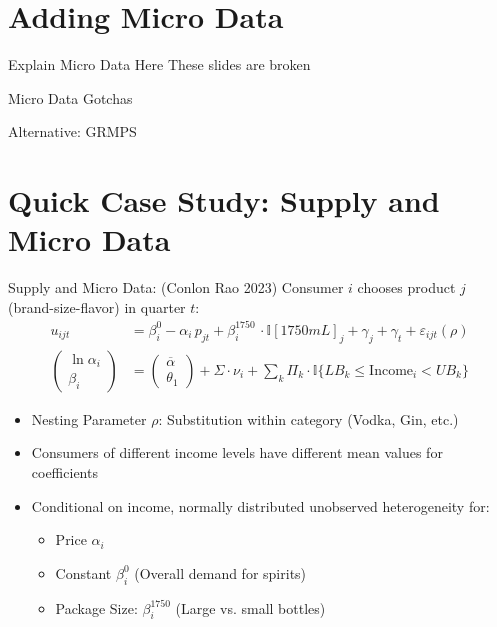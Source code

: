 \section*{Adding Micro Data}

\begin{frame}{Explain Micro Data Here}
These slides are broken
\end{frame}

\begin{frame}{Micro Data Gotchas}
\end{frame}

\begin{frame}{Alternative: GRMPS}
\end{frame}


\section*{Quick Case Study: Supply and Micro Data}

\begin{frame}{Supply and Micro Data: (Conlon Rao 2023)}
Consumer $i$ chooses product $j$ (brand-size-flavor) in quarter $t$:
\begin{align*}
u_{ijt} &= \beta_{i}^0 -  \alpha_i\, p_{jt} + \beta_i^{1750}\, \cdot \mathbb{I}[1750mL]_j + \gamma_j + \gamma_t+ \varepsilon_{ijt}(\rho)\\
\begin{pmatrix}
\ln \alpha_i\\
\beta_i
\end{pmatrix} &=
\begin{pmatrix}
\overline{\alpha}\\
\theta_1
\end{pmatrix} + \Sigma \cdot \nu_i + \sum_{k} \Pi_k \cdot \mathbb{I}\{LB_k \leq \text{Income}_i < UB_k\} 
\end{align*}
\begin{itemize}
\item Nesting Parameter $\rho$: Substitution within category (Vodka, Gin, etc.) %
\item Consumers of different income levels have different mean values for coefficients
\item Conditional on income, normally distributed unobserved heterogeneity for:
\begin{itemize}
\item Price $\alpha_i$
\item Constant $\beta_{i}^0$ (Overall demand for spirits)
\item Package Size: $\beta_{i}^{1750}$ (Large vs. small bottles)
\end{itemize}
\end{itemize}
\end{frame}


